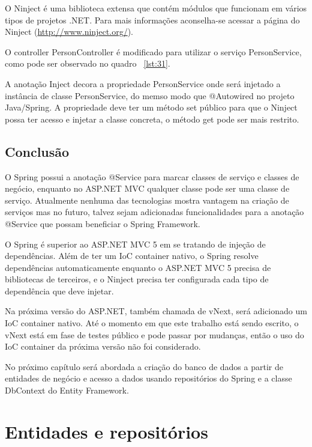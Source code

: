 \documentclass[a4paper,12pt]{article}
\newcommand{\sharpcode}[3] {
	
}
\begin{document}
O Ninject é uma biblioteca extensa que contém módulos que funcionam em vários tipos de projetos .NET. Para mais informações aconselha-se acessar a página do Ninject (\url{http://www.ninject.org/}).

O controller PersonController é modificado para utilizar o serviço PersonService, como pode ser observado no quadro ~\ref{lst:31}.

\sharpcode{code/31.txt}{PersonController do projeto ASP.NET MVC usando PersonService}{lst:31}

A anotação Inject decora a propriedade PersonService onde será injetado a instância de classe PersonService, do memso modo que @Autowired no projeto Java/Spring. A propriedade deve ter um método set público para que o Ninject possa ter acesso e injetar a classe concreta, o método get pode ser mais restrito.

\subsection{Conclusão}

O Spring possui a anotação @Service para marcar classes de serviço e classes de negócio, enquanto no ASP.NET MVC qualquer classe pode ser uma classe de serviço. Atualmente nenhuma das tecnologias mostra vantagem na criação de serviços mas no futuro, talvez sejam adicionadas funcionalidades para a anotação @Service que possam beneficiar o Spring Framework.

O Spring é superior ao ASP.NET MVC 5 em se tratando de injeção de dependências. Além de ter um IoC container nativo, o Spring resolve dependências automaticamente enquanto o ASP.NET MVC 5 precisa de bibliotecas de terceiros, e o Ninject precisa ter configurada cada tipo de dependência que deve injetar.

Na próxima versão do ASP.NET, também chamada de vNext, será adicionado um IoC container nativo. Até o momento em que este trabalho está sendo escrito, o vNext está em fase de testes público e pode passar por mudanças, então o uso do IoC container da próxima versão não foi considerado.

No próximo capítulo será abordada a criação do banco de dados a partir de entidades de negócio e acesso a dados usando repositórios do Spring e a classe DbContext do Entity Framework.

\newpage
\section{Entidades e repositórios}
\end{document}
